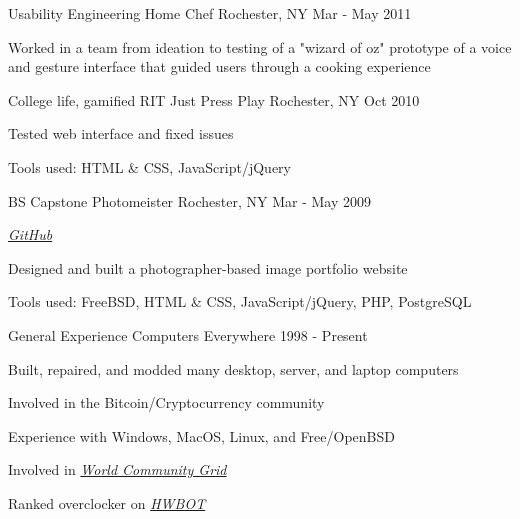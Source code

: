 \begin{cventries}
  \cventry
    {Usability Engineering} %
    {Home Chef} %
    {Rochester, NY} %
    {Mar - May 2011} %
    {
      \begin{cvitems} %
        \item {Worked in a team from ideation to testing of a "wizard of oz" prototype of a voice and gesture interface that guided users through a cooking experience}
      \end{cvitems}
    }

  \cventry
    {College life, gamified} %
    {RIT Just Press Play} %
    {Rochester, NY} %
    {Oct 2010} %
    {
      \begin{cvitems} %
        \item {Tested web interface and fixed issues}
        \item {Tools used: HTML \& CSS, JavaScript/jQuery}
      \end{cvitems}
    }


  \cventry
    {BS Capstone} %
    {Photomeister} %
    {Rochester, NY} %
    {Mar - May 2009} %
    {
      \begin{cvitems} %
        \item {\emph{\href{https://github.com/desnudopenguino/photomeister}{GitHub}}}
        \item {Designed and built a photographer-based image portfolio website}
        \item {Tools used: FreeBSD, HTML \& CSS, JavaScript/jQuery, PHP, PostgreSQL}
      \end{cvitems}
    }


  \cventry
    {General Experience} %
    {Computers} %
    {Everywhere} %
    {1998 - Present} %
    {
      \begin{cvitems} %
        \item {Built, repaired, and modded many desktop, server, and laptop computers}
        \item {Involved in the Bitcoin/Cryptocurrency community}
        \item {Experience with Windows, MacOS, Linux, and Free/OpenBSD}
        \item {Involved in \emph{\href{https://www.worldcommunitygrid.org/stats/viewMemberInfo.do?userName=desnudopenguino}{World Community Grid}}}
        \item {Ranked overclocker on \emph{\href{https://hwbot.org/user/desnudopenguino/}{HWBOT}}}
      \end{cvitems}
   }

\end{cventries}
